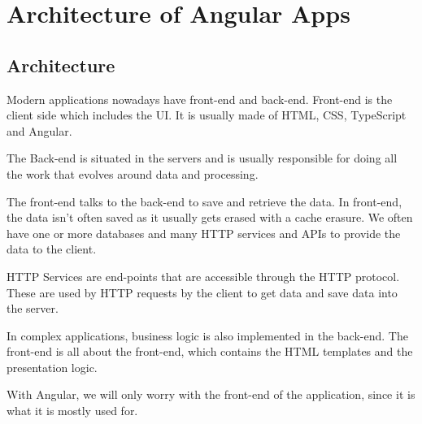 \chapter{Architecture of Angular Apps}
    \section{Architecture}
    Modern applications nowadays have front-end and back-end. Front-end is the client side which includes the UI. It is usually made of HTML, CSS, TypeScript and Angular.

    The Back-end is situated in the servers and is usually responsible for doing all the work that evolves around data and processing.

    The front-end talks to the back-end to save and retrieve the data. In front-end, the data isn't often saved as it usually gets erased with a cache erasure. We often have one or more databases and many HTTP services and APIs to provide the data to the client.

    HTTP Services are end-points that are accessible through the HTTP protocol. These are used by HTTP requests by the client to get data and save data into the server.

    In complex applications, business logic is also implemented in the back-end. The front-end is all about the front-end, which contains the HTML templates and the presentation logic.

    With Angular, we will only worry with the front-end of the application, since it is what it is mostly used for.
